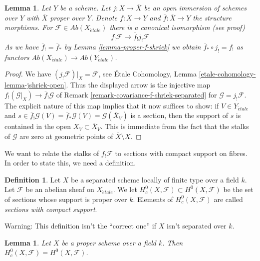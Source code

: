\documentclass{stacks-project}
\theoremstyle{plain}
\newtheorem{lemma}[subsection]{Lemma}
\theoremstyle{definition}
\newtheorem{definition}[subsection]{Definition}
\theoremstyle{remark}
\numberwithin{equation}{subsection}
\def\etale{{\acute{e}tale}}
\begin{document}
\begin{lemma}
\label{lemma-compactify-f-shriek-separated}
Let $Y$ be a scheme. Let $j : X \to \overline{X}$ be an open
immersion of schemes over $Y$ with $\overline{X}$ proper over $Y$.
Denote $f : X \to Y$ and $\overline{f} : \overline{X} \to Y$
the structure morphisms. For $\mathcal{F} \in \textit{Ab}(X_\etale)$
there is a canonical isomorphism (see proof)
$$
f_!\mathcal{F} \longrightarrow \overline{f}_!j_!\mathcal{F}
$$
As we have $\overline{f}_! = \overline{f}_*$ by
Lemma \ref{lemma-proper-f-shriek} we obtain
$\overline{f}_* \circ j_! = f_!$ as functors
$\textit{Ab}(X_\etale) \to \textit{Ab}(Y_\etale)$.
\end{lemma}

\begin{proof}
We have $(j_!\mathcal{F})|_X = \mathcal{F}$, see
\'Etale Cohomology, Lemma \ref{etale-cohomology-lemma-jshriek-open}.
Thus the displayed arrow is the injective map
$f_!(\mathcal{G}|_X) \to \overline{f}_!\mathcal{G}$
of Remark \ref{remark-covariance-f-shriek-separated}
for $\mathcal{G} = j_!\mathcal{F}$. The explicit nature
of this map implies that it now suffices to show: if $V \in Y_\etale$ and
$s \in \overline{f}_!\mathcal{G}(V) = \overline{f}_*\mathcal{G}(V) =
\mathcal{G}(\overline{X}_V)$
is a section, then the support of $s$ is contained in the open
$X_V \subset \overline{X}_V$. This is immediate from the fact
that the stalks of $\mathcal{G}$ are zero at geometric
points of $\overline{X} \setminus X$.
\end{proof}

\noindent
We want to relate the stalks of $f_!\mathcal{F}$ to sections with
compact support on fibres. In order to state this, we need a definition.

\begin{definition}
\label{definition-compact-support}
Let $X$ be a separated scheme locally of finite type over a field $k$.
Let $\mathcal{F}$ be an abelian sheaf on $X_\etale$. We let
$H^0_c(X, \mathcal{F}) \subset H^0(X, \mathcal{F})$ be the
set of sections whose support is proper over $k$. Elements of
$H^0_c(X, \mathcal{F})$ are called {\it sections with compact support}.
\end{definition}

\noindent
Warning: This definition isn't the ``correct one'' if $X$ isn't
separated over $k$.

\begin{lemma}
\label{lemma-proper-compact-support}
Let $X$ be a proper scheme over a field $k$. Then
$H^0_c(X, \mathcal{F}) = H^0(X, \mathcal{F})$.
\end{lemma}
\end{document}
